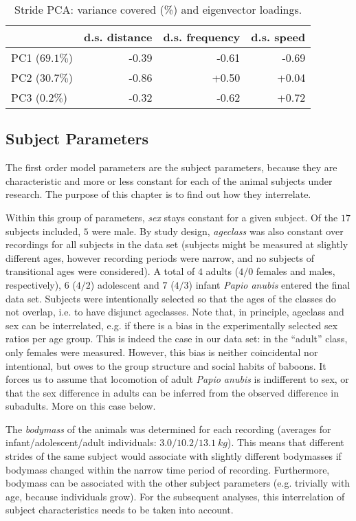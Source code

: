 \begin{table}[p]
\caption{\label{tab:stridepca}Stride PCA: variance covered (\%) and eigenvector loadings.}
\centering
\begin{tabular}{lrrr}
 & d.s. distance & d.s. frequency & d.s. speed\\[0pt]
\hline
PC1 (\(69.1 \%\)) & -0.39 & -0.61 & -0.69\\[0pt]
PC2 (\(30.7 \%\)) & -0.86 & +0.50 & +0.04\\[0pt]
PC3 (\(0.2 \%\)) & -0.32 & -0.62 & +0.72\\[0pt]
\end{tabular}
\end{table}

\clearpage
\subsection{Subject Parameters}
\label{sec:orgb7153d3}
The first order model parameters are the subject parameters, because they are characteristic and more or less constant for each of the animal subjects under research.
The purpose of this chapter is to find out how they interrelate.

Within this group of parameters, \emph{sex} stays constant for a given subject.
Of the \(17\) subjects included, \(5\) were male.
By study design, \emph{ageclass} was also constant over recordings for all subjects in the data set (subjects might be measured at slightly different ages, however recording periods were narrow, and no subjects of transitional ages were considered).
A total of
\(4\) adults (\(4/0\) females and males, respectively),
\(6\) (\(4/2\)) adolescent
and \(7\) (\(4/3\)) infant
\emph{Papio anubis} entered the final data set.
Subjects were intentionally selected so that the ages of the classes do not overlap, i.e. to have disjunct ageclasses.
Note that, in principle, ageclass and sex can be interrelated, e.g. if there is a bias in the experimentally selected sex ratios per age group.
This is indeed the case in our data set: in the ``adult'' class, only females were measured.
However, this bias is neither coincidental nor intentional, but owes to the group structure and social habits of baboons.
It forces us to assume that locomotion of adult \emph{Papio anubis} is indifferent to sex, or that the sex difference in adults can be inferred from the observed difference in subadults.
More on this case below.


The \emph{bodymass} of the animals was determined for each recording (averages for infant/adolescent/adult individuals: \(3.0/10.2/13.1\ kg\)).
This means that different strides of the same subject would associate with slightly different bodymasses if bodymass changed within the narrow time period of recording.
Furthermore, bodymass can be associated with the other subject parameters (e.g. trivially with age, because individuals grow).
For the subsequent analyses, this interrelation of subject characteristics needs to be taken into account.

